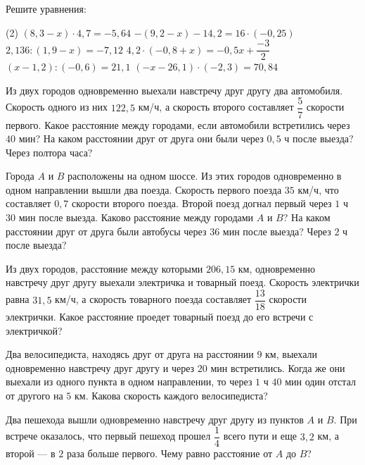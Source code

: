 \begin{class}[number=4]
	\begin{listofex}
		\item Решите уравнения: %
		\begin{tasks}(2)
			\task \( (8,3-x) \cdot 4,7 = -5,64 \)
			\task \( -(9,2-x) - 14,2 = 16 \cdot (-0,25) \)
			\task \( 2,136:(1,9-x)=-7,12 \)
			\task \( 4,2 \cdot (-0,8+x) = -0,5x + \dfrac{ -3 }{ 2 } \)
			\task \( (x-1,2) : (-0,6) = 21,1 \)
			\task \( (-x-26,1) \cdot (-2,3)=70,84 \)
		\end{tasks}
		\item Из двух городов одновременно выехали навстречу друг другу два автомобиля. Скорость одного из них \(122,5\) км/ч, а скорость второго составляет \(\dfrac{ 5 }{ 7 }\) скорости первого. Какое расстояние между городами, если автомобили встретились через \(40\) мин? На каком расстоянии друг от друга они были через \(0,5\) ч после выезда? Через полтора часа?
		\item Города \(A\) и \(B\) расположены на одном шоссе. Из этих городов одновременно в одном направлении вышли два поезда. Скорость первого поезда \(35\) км/ч, что составляет \(0,7\) скорости второго поезда. Второй поезд догнал первый через \(1\) ч \(30\) мин после выезда. Каково расстояние между городами \(A\) и \(B\)? На каком расстоянии друг от друга были автобусы через \(36\) мин после выезда? Через \(2\) ч после выезда?
		\item Из двух городов, расстояние между которыми \(206,15\) км, одновременно навстречу друг другу выехали электричка и товарный поезд. Скорость электрички равна \(31,5\) км/ч, а скорость товарного поезда составляет \(\dfrac{ 13 }{ 18 }\) скорости электрички. Какое расстояние проедет товарный поезд до его встречи с электричкой?
		\item Два велосипедиста, находясь друг от друга на расстоянии \(9\) км, выехали одновременно навстречу друг другу и через \(20\) мин встретились. Когда же они выехали из одного пункта в одном направлении, то через \(1\) ч \(40\) мин один отстал от другого на \(5\) км. Какова скорость каждого велосипедиста?
		\item Два пешехода вышли одновременно навстречу друг другу из пунктов \(A\) и \(B\). При встрече оказалось, что первый пешеход прошел \(\dfrac{ 1 }{ 4 }\) всего пути и еще \(3,2\) км, а второй --- в \(2\) раза больше первого. Чему равно расстояние от \(A\) до \(B\)?
	\end{listofex}
\end{class}

